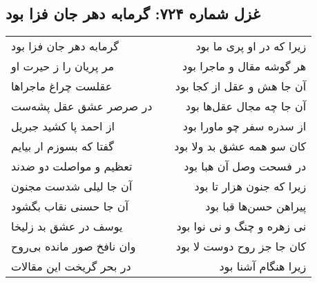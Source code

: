 \begin{center}
\section*{غزل شماره ۷۲۴: گرمابه دهر جان فزا بود}
\label{sec:0724}
\begin{longtable}{l p{0.5cm} r}
گرمابه دهر جان فزا بود
&&
زیرا که در او پری ما بود
\\
مر پریان را ز حیرت او
&&
هر گوشه مقال و ماجرا بود
\\
عقلست چراغ ماجراها
&&
آن جا هش و عقل از کجا بود
\\
در صرصر عشق عقل پشه‌ست
&&
آن جا چه مجال عقل‌ها بود
\\
از احمد پا کشید جبریل
&&
از سدره سفر چو ماورا بود
\\
گفتا که بسوزم ار بیایم
&&
کان سو همه عشق بد ولا بود
\\
تعظیم و مواصلت دو ضدند
&&
در فسحت وصل آن هبا بود
\\
آن جا لیلی شدست مجنون
&&
زیرا که جنون هزار تا بود
\\
آن جا حسنی نقاب بگشود
&&
پیراهن حسن‌ها قبا بود
\\
یوسف در عشق بد زلیخا
&&
نی زهره و چنگ و نی نوا بود
\\
وان نافخ صور مانده بی‌روح
&&
کان جا جز روح دوست لا بود
\\
در بحر گریخت این مقالات
&&
زیرا هنگام آشنا بود
\\
\end{longtable}
\end{center}
